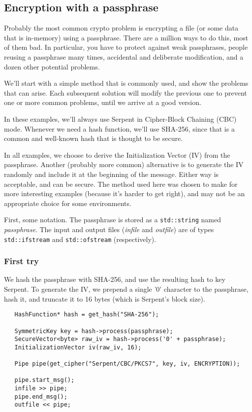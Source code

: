 \documentclass{article}
\newcommand{\type}[1]{\texttt{#1}}
\newcommand{\variable}[1]{\textsl{#1}}
\begin{document}
\subsection{Encryption with a passphrase}

Probably the most common crypto problem is encrypting a file (or some data that
is in-memory) using a passphrase. There are a million ways to do this, most of
them bad. In particular, you have to protect against weak passphrases,
people reusing a passphrase many times, accidental and deliberate modification,
and a dozen other potential problems.

We'll start with a simple method that is commonly used, and show the problems
that can arise. Each subsequent solution will modify the previous one to
prevent one or more common problems, until we arrive at a good version.

In these examples, we'll always use Serpent in Cipher-Block Chaining
(CBC) mode. Whenever we need a hash function, we'll use SHA-256, since
that is a common and well-known hash that is thought to be secure.

In all examples, we choose to derive the Initialization Vector (IV) from the
passphrase. Another (probably more common) alternative is to generate the IV
randomly and include it at the beginning of the message. Either way is
acceptable, and can be secure. The method used here was chosen to make for more
interesting examples (because it's harder to get right), and may not be an
appropriate choice for some environments.

First, some notation. The passphrase is stored as a \type{std::string} named
\variable{passphrase}. The input and output files (\variable{infile} and
\variable{outfile}) are of types \type{std::ifstream} and \type{std::ofstream}
(respectively).

\subsubsection{First try}

We hash the passphrase with SHA-256, and use the resulting hash to key
Serpent. To generate the IV, we prepend a single '0' character to the
passphrase, hash it, and truncate it to 16 bytes (which is Serpent's
block size).

\begin{verbatim}
   HashFunction* hash = get_hash("SHA-256");

   SymmetricKey key = hash->process(passphrase);
   SecureVector<byte> raw_iv = hash->process('0' + passphrase);
   InitializationVector iv(raw_iv, 16);

   Pipe pipe(get_cipher("Serpent/CBC/PKCS7", key, iv, ENCRYPTION));

   pipe.start_msg();
   infile >> pipe;
   pipe.end_msg();
   outfile << pipe;
\end{verbatim}
\end{document}
